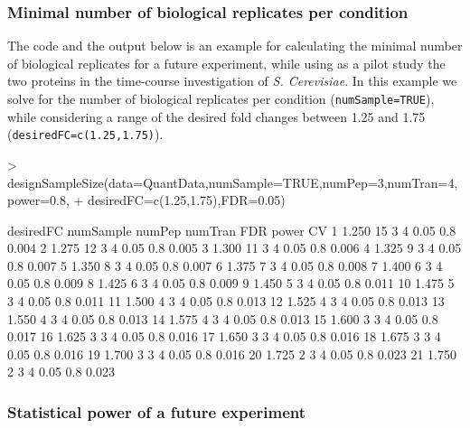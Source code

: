 \documentclass[11pt]{article}
\begin{document}
\subsubsection{Minimal number of biological replicates per condition}

The code and the output  below is an example for calculating the minimal number of biological replicates for a future experiment, while using as a pilot study the two proteins in the  time-course investigation of {\it S. Cerevisiae}. In this example we solve for the number of biological replicates per condition ({\tt numSample=TRUE}), while considering a range of the desired fold changes between 1.25 and 1.75 ({\tt desiredFC=c(1.25,1.75)}).

\begin{small}
\begin{Schunk}
\begin{Sinput}
> designSampleSize(data=QuantData,numSample=TRUE,numPep=3,numTran=4,power=0.8,
+                  desiredFC=c(1.25,1.75),FDR=0.05)
\end{Sinput}
\begin{Soutput}
   desiredFC numSample numPep numTran  FDR power    CV
1      1.250        15      3       4 0.05   0.8 0.004
2      1.275        12      3       4 0.05   0.8 0.005
3      1.300        11      3       4 0.05   0.8 0.006
4      1.325         9      3       4 0.05   0.8 0.007
5      1.350         8      3       4 0.05   0.8 0.007
6      1.375         7      3       4 0.05   0.8 0.008
7      1.400         6      3       4 0.05   0.8 0.009
8      1.425         6      3       4 0.05   0.8 0.009
9      1.450         5      3       4 0.05   0.8 0.011
10     1.475         5      3       4 0.05   0.8 0.011
11     1.500         4      3       4 0.05   0.8 0.013
12     1.525         4      3       4 0.05   0.8 0.013
13     1.550         4      3       4 0.05   0.8 0.013
14     1.575         4      3       4 0.05   0.8 0.013
15     1.600         3      3       4 0.05   0.8 0.017
16     1.625         3      3       4 0.05   0.8 0.016
17     1.650         3      3       4 0.05   0.8 0.016
18     1.675         3      3       4 0.05   0.8 0.016
19     1.700         3      3       4 0.05   0.8 0.016
20     1.725         2      3       4 0.05   0.8 0.023
21     1.750         2      3       4 0.05   0.8 0.023
\end{Soutput}
\end{Schunk}
\end{small}

\subsubsection{Statistical power of a future experiment}
\end{document}
